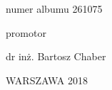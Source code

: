 \begin{titlepage}
\begin{center}
\begin{phv}
        \fontsize{12pt}{0pt}\selectfont
        numer albumu 261075 \\
        
        \vspace{48pt}
        
        \fontsize{12pt}{0pt}\selectfont
        promotor \\
        
        \vspace{4pt}
        
        dr inż. Bartosz Chaber
        
        \vfill
        
        \fontsize{12pt}{0pt}\selectfont
        WARSZAWA 2018
        
        \vspace{48pt}
	\end{phv}
\end{center}\end{titlepage}